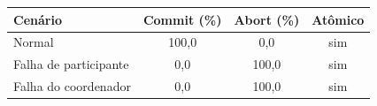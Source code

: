 \begin{tabular}{lccc}
\toprule
Cenário & Commit (\%) & Abort (\%) & Atômico \\
\midrule
Normal & 100,0 & 0,0 & sim \\
Falha de participante & 0,0 & 100,0 & sim \\
Falha do coordenador & 0,0 & 100,0 & sim \\
\bottomrule
\end{tabular}